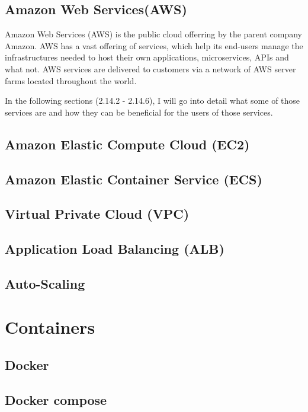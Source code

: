 	\subsection{Amazon Web Services(AWS)}
	Amazon Web Services (AWS) is the public cloud offerring by the parent company Amazon. AWS has a vast offering
	of services, which help its end-users manage the infrastructures needed to host their own applications, 
	microservices, APIs and what not.
	AWS services are delivered to customers via a network of AWS server farms located throughout the world.

	In the following sections (2.14.2 - 2.14.6), I will go into detail what some of those services are and how
	they can be beneficial for the users of those services.

	\subsection{Amazon Elastic Compute Cloud (EC2)}

	\subsection{Amazon Elastic Container Service (ECS)}

	\subsection{Virtual Private Cloud (VPC)}

	\subsection{Application Load Balancing (ALB)}

	\subsection{Auto-Scaling}

\section{Containers}

	\subsection{Docker}

	\subsection{Docker compose}
